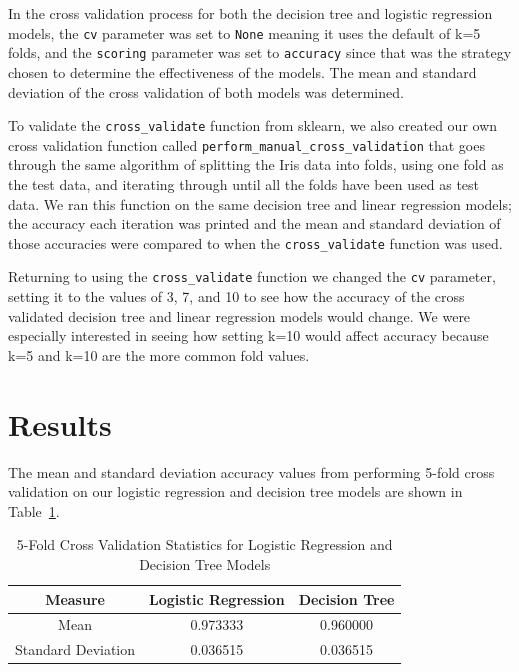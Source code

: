 \documentclass[journal]{IEEEtran}
\begin{document}
\newpage

In the cross validation process for both the decision tree and logistic regression models, the \lstinline{cv} parameter was set to \lstinline{None} meaning it uses the default of k=5 folds, and the \lstinline{scoring} parameter was set to \lstinline{accuracy} since that was the strategy chosen to determine the effectiveness of the models. The mean and standard deviation of the cross validation of both models was determined. 

To validate the \lstinline{cross_validate} function from sklearn, we also created our own cross validation function called \lstinline{perform_manual_cross_validation} that goes through the same algorithm of splitting the Iris data into folds, using one fold as the test data, and iterating through until all the folds have been used as test data. We ran this function on the same decision tree and linear regression models; the accuracy each iteration was printed and the mean and standard deviation of those accuracies were compared to when the \lstinline{cross_validate} function was used. 

Returning to using the \lstinline{cross_validate} function we changed the \lstinline{cv} parameter, setting it to the values of 3, 7, and 10 to see how the accuracy of the cross validated decision tree and linear regression models would change. We were especially interested in seeing how setting k=10 would affect accuracy because k=5 and k=10 are the more common fold values.


\section{Results}
\label{sec:results}

The mean and standard deviation accuracy values from performing 5-fold cross validation on our logistic regression and decision tree models are shown in Table~\ref{table:5FoldCV}.

\begin{table}[h!]
\centering
\begin{tabular}{ c | c c }
Measure & Logistic Regression & Decision Tree \\
\hline
Mean & 0.973333 & 0.960000 \\
Standard Deviation & 0.036515 & 0.036515 \\
\end{tabular}
\caption{5-Fold Cross Validation Statistics for Logistic Regression and Decision Tree Models}
\label{table:5FoldCV}
\end{table}
\end{document}
